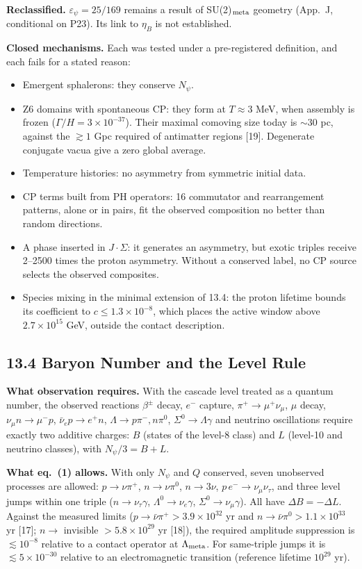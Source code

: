 \documentclass[11pt,letterpaper]{article}
\begin{document}
\noindent \textbf{Reclassified. }$\varepsilon_\psi=25/169$ remains a result of SU(2)$_{\rm meta}$ geometry (App.~J, conditional on P23). Its link to $\eta_B$ is not established.

\noindent \textbf{Closed mechanisms. }Each was tested under a pre-registered definition, and each fails for a stated reason:
\begin{itemize}
\item Emergent sphalerons: they conserve $N_\psi$.
\item Z6 domains with spontaneous CP: they form at $T\approx3$ MeV, when assembly is frozen ($\Gamma/H=3\times10^{-37}$). Their maximal comoving size today is $\sim30$ pc, against the $\gtrsim1$ Gpc required of antimatter regions [19]. Degenerate conjugate vacua give a zero global average.
\item Temperature histories: no asymmetry from symmetric initial data.
\item CP terms built from PH operators: 16 commutator and rearrangement patterns, alone or in pairs, fit the observed composition no better than random directions.
\item A phase inserted in $J\!\cdot\!\Sigma$: it generates an asymmetry, but exotic triples receive 2--2500 times the proton asymmetry. Without a conserved label, no CP source selects the observed composites.
\item Species mixing in the minimal extension of 13.4: the proton lifetime bounds its coefficient to $c\le1.3\times10^{-8}$, which places the active window above $2.7\times10^{15}$ GeV, outside the contact description.
\end{itemize}

\subsection*{13.4  Baryon Number and the Level Rule}

\noindent \textbf{What observation requires. }With the cascade level treated as a quantum number, the observed reactions $\beta^\pm$ decay, $e^-$ capture, $\pi^+\to\mu^+\nu_\mu$, $\mu$ decay, $\nu_\mu n\to\mu^-p$, $\bar\nu_ep\to e^+n$, $\Lambda\to p\pi^-,n\pi^0$, $\Sigma^0\to\Lambda\gamma$ and neutrino oscillations require exactly two additive charges: $B$ (states of the level-8 class) and $L$ (level-10 and neutrino classes), with $N_\psi/3=B+L$.

\noindent \textbf{What eq.~(1) allows. }With only $N_\psi$ and $Q$ conserved, seven unobserved processes are allowed: $p\to\nu\pi^+$, $n\to\nu\pi^0$, $n\to3\nu$, $p\,e^-\to\nu_\mu\nu_\tau$, and three level jumps within one triple ($n\to\nu_\tau\gamma$, $\Lambda^0\to\nu_e\gamma$, $\Sigma^0\to\nu_\mu\gamma$). All have $\Delta B=-\Delta L$. Against the measured limits ($p\to\bar\nu\pi^+>3.9\times10^{32}$ yr and $n\to\bar\nu\pi^0>1.1\times10^{33}$ yr [17]; $n\to$ invisible $>5.8\times10^{29}$ yr [18]), the required amplitude suppression is $\lesssim10^{-8}$ relative to a contact operator at $\Lambda_{\rm meta}$. For same-triple jumps it is $\lesssim5\times10^{-30}$ relative to an electromagnetic transition (reference lifetime $10^{29}$ yr).
\end{document}
